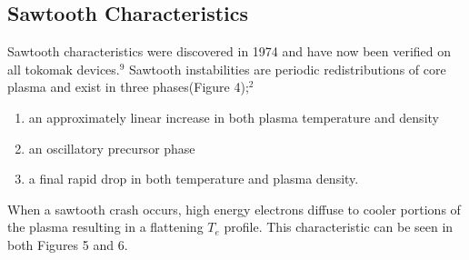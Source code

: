 \documentclass{article}
\begin{document}
\subsection{Sawtooth Characteristics}
Sawtooth characteristics were discovered in 1974 and have now been verified on all tokomak devices.$^{9}$  Sawtooth instabilities are periodic redistributions of core plasma and exist in three phases(Figure 4);$^{2}$
\begin{enumerate}
\item an approximately linear increase in both plasma temperature and density
\item an oscillatory precursor phase
\item a final rapid drop in both temperature and plasma density.
\end{enumerate}
\begin{SCfigure}
\centering
{}
\end{SCfigure}
When a sawtooth crash occurs, high energy electrons diffuse to cooler portions of the plasma resulting in a flattening $T_e$ profile.  This characteristic can be seen in both Figures 5 and 6.
\begin{SCfigure}
\centering
{}
\end{SCfigure}
\begin{SCfigure}
\centering
{}
\end{SCfigure}
\end{document}
